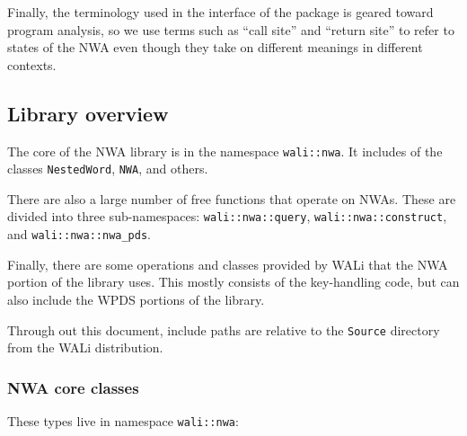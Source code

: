 Finally, the terminology used in the interface of the package is geared
toward program analysis, so we use terms such as ``call site'' and ``return
site'' to refer to states of the NWA even though they take on different
meanings in different contexts.


\subsection{Library overview}

The core of the NWA library is in the namespace \texttt{wali::nwa}. It
includes of the classes \texttt{NestedWord}, \texttt{NWA}, and others.

There are also a large number of free functions that operate on NWAs. These
are divided into three sub-namespaces:
\texttt{wali::nwa::query}, \texttt{wali::nwa::construct}, and
\texttt{wali::nwa::nwa\_pds}.

Finally, there are some operations and classes provided by WALi that the NWA
portion of the library uses. This mostly consists of the key-handling code,
but can also include the WPDS portions of the library.

Through out this document, include paths are relative to the \texttt{Source}
directory from the WALi distribution.

\subsubsection{NWA core classes}

These types live in namespace \texttt{wali::nwa}:

